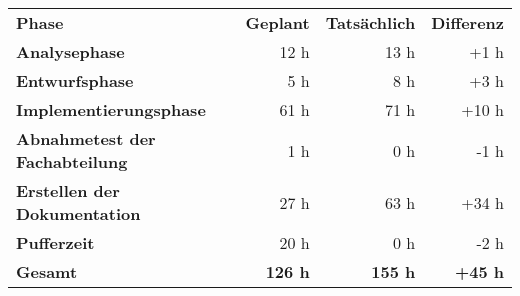 \begin{tabular}{lrrr}
\rowcolor{heading}\textbf{Phase} & \textbf{Geplant}  & \textbf{Tatsächlich}  & \textbf{Differenz}  \\
\textbf{Analysephase} & 12 h  & 13 h  & +1 h  \\
\rowcolor{odd}\textbf{Entwurfsphase} & 5 h  & 8 h  & +3 h   \\
\textbf{Implementierungsphase} & 61 h  & 71 h  & +10 h   \\
\rowcolor{odd}\textbf{Abnahmetest der Fachabteilung} & 1 h  & 0 h  & -1 h   \\
\textbf{Erstellen der Dokumentation} & 27 h  & 63 h  & +34 h  \\
\rowcolor{odd}\textbf{Pufferzeit} & 20 h  & 0 h  & -2 h  \\
\hline
\hline
\rowcolor{heading}\textbf{Gesamt} & \textbf{126 h}  & \textbf{155 h}  &  \textbf{+45 h}  \\
\end{tabular}
